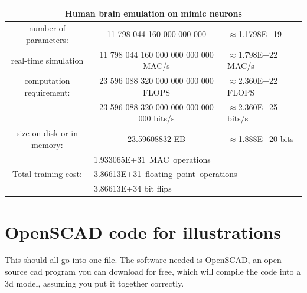 \documentclass[a4paper]{article}
\begin{document}
	\vfill
	
	\begin{center}
		\begin{tabular}{| c | c | l |}
			\hline
			\multicolumn{3}{|c|}{Human brain emulation on mimic neurons} \\\hline
			number of parameters: & 11 798 044 160 000 000 000 & $\approx$1.1798E+19 \\\hline
			real-time simulation & 11 798 044 160 000 000 000 000 MAC/s & $\approx$1.798E+22 MAC/s \\
			computation requirement: & 23 596 088 320 000 000 000 000 FLOPS & $\approx$2.360E+22 FLOPS \\
			& 23 596 088 320 000 000 000 000 000 bits/s & $\approx$2.360E+25 bits/s \\\hline
			size on disk or in memory: & 23.59608832 EB & $\approx$1.888E+20 bits \\\hline
			& \multicolumn{2}{|l|}{1.933065E+31~MAC~operations} \\
			Total training cost: & \multicolumn{2}{|l|}{3.86613E+31~floating~point~operations} \\
			& \multicolumn{2}{|l|}{3.86613E+34 bit flips} \\\hline
		\end{tabular}
	\end{center}
	
	\vfill
	
    
	\pagebreak
	
	\section{OpenSCAD code for illustrations}
	
    This should all go into one file. The software needed is OpenSCAD, an open source cad program you can download for free, which will compile the code into a 3d model, assuming you put it together correctly.
    
\end{document}
